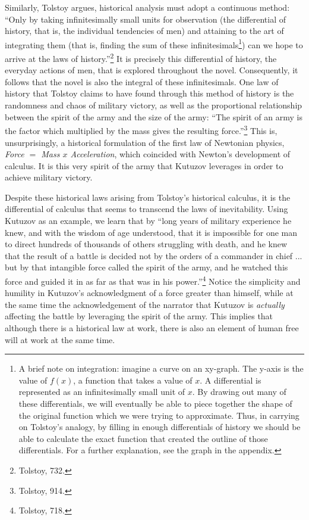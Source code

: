\documentclass[12pt]{article}
\begin{document}
Similarly, Tolstoy argues, historical analysis must adopt a continuous method: ``Only by taking infinitesimally small units for observation (the differential of history, that is, the individual tendencies of men) and attaining to the art of integrating them (that is, finding the sum of these infinitesimals\footnote{A brief note on integration: imagine a curve on an xy-graph. The y-axis is the value of $f(x)$, a function that takes a value of $x$. A differential is represented as an infinitesimally small unit of $x$. By drawing out many of these differentials, we will eventually be able to piece together the shape of the original function which we were trying to approximate. Thus, in carrying on Tolstoy's analogy, by filling in enough differentials of history we should be able to calculate the exact function that created the outline of those differentials. For a further explanation, see the graph in the appendix.}) can we hope to arrive at the laws of history.''\footnote{Tolstoy, 732.} It is precisely this differential of history, the everyday actions of men, that is explored throughout the novel. Consequently, it follows that the novel is also the integral of these infinitesimals. One law of history that Tolstoy claims to have found through this method of history is the randomness and chaos of military victory, as well as the proportional relationship between the spirit of the army and the size of the army: ``The spirit of an army is the factor which multiplied by the mass gives the resulting force.''\footnote{Tolstoy, 914.} This is, unsurprisingly, a historical formulation of the first law of Newtonian physics, \emph{Force $=$ Mass $x$ Acceleration}, which coincided with Newton's development of calculus. It is this very spirit of the army that Kutuzov leverages in order to achieve military victory.

Despite these historical laws arising from Tolstoy's historical calculus, it is the differential of calculus that seems to transcend the laws of inevitability. Using Kutuzov as an example, we learn that by ``long years of military experience he knew, and with the wisdom of age understood, that it is impossible for one man to direct hundreds of thousands of others struggling with death, and he knew that the result of a battle is decided not by the orders of a commander in chief ... but by that intangible force called the spirit of the army, and he watched this force and guided it in as far as that was in his power.''\footnote{Tolstoy, 718.} Notice the simplicity and humility in Kutuzov's acknowledgment of a force greater than himself, while at the same time the acknowledgement of the narrator that Kutuzov is \emph{actually} affecting the battle by leveraging the spirit of the army. This implies that although there is a historical law at work, there is also an element of human free will at work at the same time.
\end{document}

